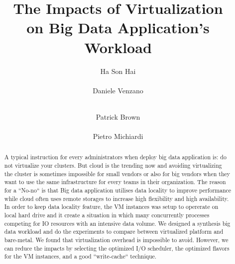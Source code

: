 \documentclass{acmsig}
\begin{document}
\title{The Impacts of Virtualization\\ on Big Data Application's Workload}


\author{
\alignauthor
Ha Son Hai\\
       \\
\alignauthor
Daniele Venzano\\
       \\
\and
\alignauthor
Patrick Brown\\
       \\
\alignauthor
Pietro Michiardi
       \\
}

\maketitle


\begin{abstract}
A typical instruction for every administrators when deploy big data application is: do not virtualize your clusters. But cloud is the trending now and avoiding virtualizing the cluster is sometimes impossible for small vendors or also for big vendors when they want to use the same infrastructure for every teams in their organization. The reason for a ``No-no`` is that Big data application utilises data locality to improve performance while cloud often uses remote storages to increase high flexibility and high availability. In order to keep data locality feature, the VM instances was setup to opererate on local hard drive and it create a situation in which many concurrently processes competing for IO resources with an intensive data volume. We designed a synthesis big data workload and do the experiments to compare between virtualized platform and bare-metal. We found that virtualization overhead is impossible to avoid. However, we can reduce the impacts by selecting the optimized I/O scheduler, the optimized flavors for the VM instances, and a good ``write-cache`` technique.

\end{abstract}
\end{document}
